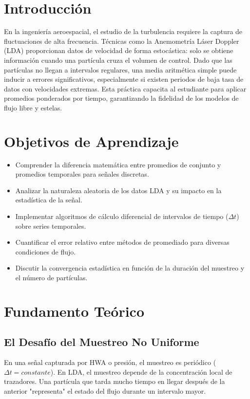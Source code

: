 \documentclass[11pt, a4paper]{article}
\begin{document}
\section{Introducción}
En la ingeniería aeroespacial, el estudio de la turbulencia requiere la captura de fluctuaciones de alta frecuencia. Técnicas como la Anemometría Láser Doppler (LDA) proporcionan datos de velocidad de forma estocástica: solo se obtiene información cuando una partícula cruza el volumen de control. Dado que las partículas no llegan a intervalos regulares, una media aritmética simple puede inducir a errores significativos, especialmente si existen periodos de baja tasa de datos con velocidades extremas. Esta práctica capacita al estudiante para aplicar promedios ponderados por tiempo, garantizando la fidelidad de los modelos de flujo libre y estelas.

\section{Objetivos de Aprendizaje}
\begin{itemize}[label=-]
    \item Comprender la diferencia matemática entre promedios de conjunto y promedios temporales para señales discretas.
    \item Analizar la naturaleza aleatoria de los datos LDA y su impacto en la estadística de la señal.
    \item Implementar algoritmos de cálculo diferencial de intervalos de tiempo ($\Delta t$) sobre series temporales.
    \item Cuantificar el error relativo entre métodos de promediado para diversas condiciones de flujo.
    \item Discutir la convergencia estadística en función de la duración del muestreo y el número de partículas.
\end{itemize}

\section{Fundamento Teórico}

\subsection{El Desafío del Muestreo No Uniforme}
En una señal capturada por HWA o presión, el muestreo es periódico ($\Delta t = constante$). En LDA, el muestreo depende de la concentración local de trazadores. Una partícula que tarda mucho tiempo en llegar después de la anterior "representa" el estado del flujo durante un intervalo mayor.
\end{document}
